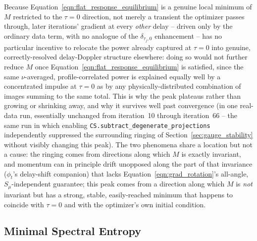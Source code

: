 \documentclass[manuscript]{aastex631}
\newcommand{\Eqn}[1]{Equation~\ref{eqn:#1}}
\begin{document}
Because \Eqn{flat_response_equilibrium} is a genuine local minimum of $M$ restricted to the
$\tau=0$ direction, not merely a transient the optimizer passes through, later iterations' gradient
at every \emph{other} delay -- driven only by the ordinary data term, with no analogue of the
$\delta_{\tau_j,0}$ enhancement -- has no particular incentive to relocate the power already
captured at $\tau=0$ into genuine, correctly-resolved delay-Doppler structure elsewhere: doing so
would not further reduce $M$ once \Eqn{flat_response_equilibrium} is satisfied, since the same
$\nu$-averaged, profile-correlated power is explained equally well by a concentrated impulse at
$\tau=0$ as by any physically-distributed combination of images summing to the same total. This is
why the peak plateaus rather than growing or shrinking away, and why it survives well past
convergence (in one real-data run, essentially unchanged from iteration~10 through iteration~66 --
the same run in which enabling \texttt{CS.subtract\_degenerate\_projections} independently
suppressed the surrounding ringing of Section~\ref{sec:gauge_stability} without visibly changing
this peak). The two phenomena share a location but not a cause: the ringing comes from directions
along which $M$ is exactly invariant, and momentum can in principle drift unopposed along the part
of that invariance ($\phi_t$'s delay-shift companion) that lacks \Eqn{grad_rotation}'s all-angle,
$S_\mu$-independent guarantee; this peak comes from a direction along which $M$ is \emph{not}
invariant but has a strong, stable, easily-reached minimum that happens to coincide with $\tau=0$
and with the optimizer's own initial condition.




\subsection{Minimal Spectral Entropy}
\end{document}

